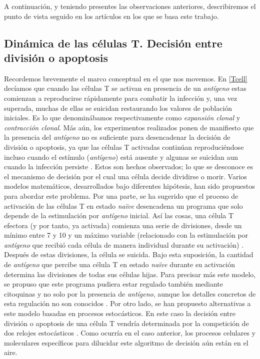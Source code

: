 
A continuación, y teniendo presentes las observaciones anteriores, describiremos el punto de vista seguido en los artículos en los que se basa este trabajo.


\subsection{Dinámica de las células T. Decisión entre división o apoptosis}
\label{cuestionAmodelizar}

Recordemos brevemente el marco conceptual en el que nos movemos. En \ref{Tcell} decíamos que cuando las células T se activan en presencia de un \textit{antígeno} estas comienzan a reproducirse rápidamente para combatir la infección y, una vez superada, muchas de ellas se suicidan restaurando los valores de población iniciales. Es lo que denominábamos respectivamente como \textit{expansión clonal} y \textit{contracción clonal}. Más aún, los experimentos realizados ponen de manifiesto que la presencia del \textit{antígeno} no es suficiente para desencadenar la decisión de división o apoptosis, ya que las células T activadas continúan reproduciéndose incluso cuando el estímulo (\textit{antígeno}) está ausente y algunas se suicidan aun cuando la infección persiste \citep{JTB}. Estos son hechos observados; lo que se desconoce es el mecanismo de decisión por el cual una célula decide dividirse o morir. Varios modelos matemáticos, desarrollados bajo diferentes hipótesis, han sido propuestos para abordar este problema. Por una parte, se ha sugerido que el proceso de activación de las células T en estado \textit{naïve} desencadena un programa que solo depende de la estimulación por \textit{antígeno} inicial. Así las cosas, una célula T efectora (y por tanto, ya activada) comienza una serie de divisiones, desde un mínimo entre 7 y 10 y un máximo variable (relacionado con la estimulación por \textit{antígeno} que recibió cada célula de manera individual durante su activación) \citep{Hawkins5032}. Después de estas divisiones, la célula se suicida. Bajo esta suposición, la cantidad de \textit{antígeno} que percibe una célula T en estado \textit{naïve} durante su activación determina las divisiones de todas sus células hijas. Para precisar más este modelo, se propuso que este programa pudiera estar regulado también mediante citoquinas y no solo por la presencia de \textit{antígeno}, aunque los detalles concretos de esta regulación no son conocidos \citep{JTB}. Por otro lado, se han propuesto alternativas a este modelo basadas en procesos estocásticos. En este caso la decisión entre división o apoptosis de una célula T vendría determinada por la competición de dos relojes estocásticos \citep{DUFFY2012457}. Como ocurría en el caso anterior, los procesos celulares y moleculares específicos para dilucidar este algoritmo de decisión aún están en el aire. 

